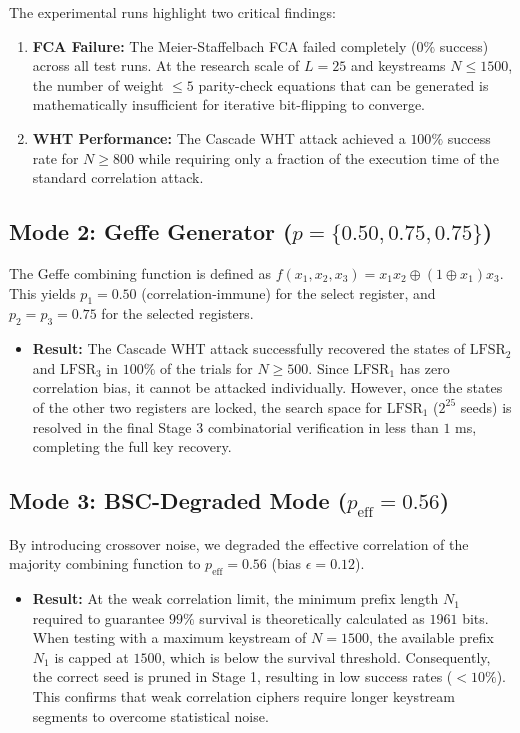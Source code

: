 The experimental runs highlight two critical findings:
\begin{enumerate}
    \item \textbf{FCA Failure:} The Meier-Staffelbach FCA failed completely ($0\%$ success) across all test runs. At the research scale of $L=25$ and keystreams $N \le 1500$, the number of weight $\le 5$ parity-check equations that can be generated is mathematically insufficient for iterative bit-flipping to converge.
    \item \textbf{WHT Performance:} The Cascade WHT attack achieved a $100\%$ success rate for $N \ge 800$ while requiring only a fraction of the execution time of the standard correlation attack.
\end{enumerate}

\subsection{Mode 2: Geffe Generator ($p = \{0.50, 0.75, 0.75\}$)}
The Geffe combining function is defined as $f(x_1, x_2, x_3) = x_1 x_2 \oplus (1 \oplus x_1) x_3$. This yields $p_1 = 0.50$ (correlation-immune) for the select register, and $p_2 = p_3 = 0.75$ for the selected registers.
\begin{itemize}
    \item \textbf{Result:} The Cascade WHT attack successfully recovered the states of $\text{LFSR}_2$ and $\text{LFSR}_3$ in $100\%$ of the trials for $N \ge 500$. Since $\text{LFSR}_1$ has zero correlation bias, it cannot be attacked individually. However, once the states of the other two registers are locked, the search space for $\text{LFSR}_1$ ($2^{25}$ seeds) is resolved in the final Stage 3 combinatorial verification in less than $1$ ms, completing the full key recovery.
\end{itemize}

\subsection{Mode 3: BSC-Degraded Mode ($p_{\text{eff}} = 0.56$)}
By introducing crossover noise, we degraded the effective correlation of the majority combining function to $p_{\text{eff}} = 0.56$ (bias $\epsilon = 0.12$).
\begin{itemize}
    \item \textbf{Result:} At the weak correlation limit, the minimum prefix length $N_1$ required to guarantee $99\%$ survival is theoretically calculated as $1961$ bits. When testing with a maximum keystream of $N = 1500$, the available prefix $N_1$ is capped at $1500$, which is below the survival threshold. Consequently, the correct seed is pruned in Stage 1, resulting in low success rates ($<10\%$). This confirms that weak correlation ciphers require longer keystream segments to overcome statistical noise.
\end{itemize}

